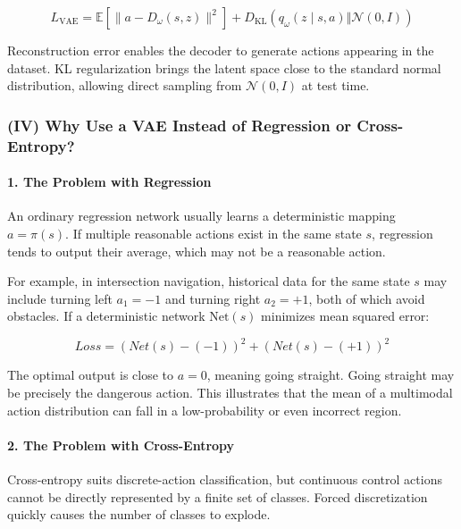 \[
L_{\mathrm{VAE}}
=\mathbb{E}[\lVert a-D_\omega(s,z)\rVert^{2}]
+ D_{\mathrm{KL}}(q_\omega(z\mid s,a)\Vert \mathcal{N}(0,I))
\]

Reconstruction error enables the decoder to generate actions appearing in the dataset. KL regularization brings the latent space close to the standard normal distribution, allowing direct sampling from \(\mathcal{N}(0,I)\) at test time.

\hypertarget{iv-why-use-a-vae-instead-of-regression-or-cross-entropy}{%
\subsubsection{(IV) Why Use a VAE Instead of Regression or Cross-Entropy?}\label{iv-why-use-a-vae-instead-of-regression-or-cross-entropy}}

\hypertarget{the-problem-with-regression}{%
\paragraph{1. The Problem with Regression}\label{the-problem-with-regression}}

An ordinary regression network usually learns a deterministic mapping \(a=\pi(s)\). If multiple reasonable actions exist in the same state \(s\), regression tends to output their average, which may not be a reasonable action.

For example, in intersection navigation, historical data for the same state \(s\) may include turning left \(a_1=-1\) and turning right \(a_2=+1\), both of which avoid obstacles. If a deterministic network \(\mathrm{Net}(s)\) minimizes mean squared error:

\[
Loss=(Net(s)-(-1))^{2}+(Net(s)-(+1))^{2}
\]

The optimal output is close to \(a=0\), meaning going straight. Going straight may be precisely the dangerous action. This illustrates that the mean of a multimodal action distribution can fall in a low-probability or even incorrect region.

\hypertarget{the-problem-with-cross-entropy}{%
\paragraph{2. The Problem with Cross-Entropy}\label{the-problem-with-cross-entropy}}

Cross-entropy suits discrete-action classification, but continuous control actions cannot be directly represented by a finite set of classes. Forced discretization quickly causes the number of classes to explode.

